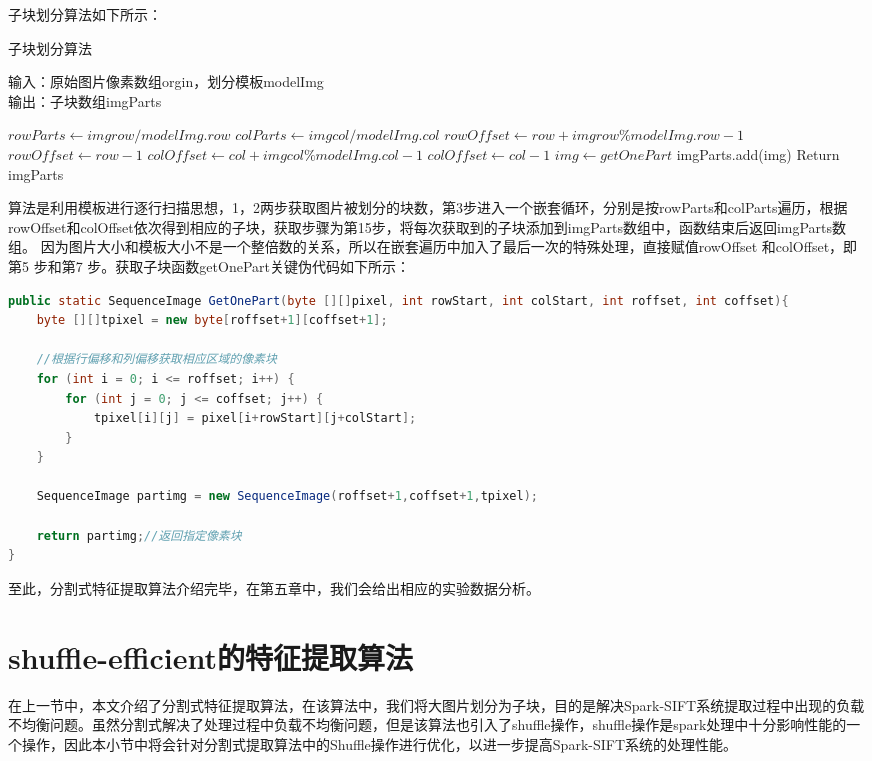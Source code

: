 子块划分算法如下所示：
\begin{algorithm}[htbp]
  \caption{子块划分算法}
  \label{algDiveModel}
  输入：原始图片像素数组orgin，划分模板modelImg\\
  输出：子块数组imgParts
  \begin{algorithmic}[1]
    \STATE $rowParts\leftarrow imgrow/modelImg.row$
    \STATE $colParts\leftarrow imgcol/modelImg.col$
        \STATE $rowOffset\leftarrow row + imgrow\%modelImg.row-1$
    \ELSE
        \STATE $rowOffset\leftarrow row - 1$
    \ENDIF
        \STATE $colOffset\leftarrow col + imgcol\%modelImg.col-1$
    \ELSE
        \STATE $colOffset\leftarrow col - 1$
    \ENDIF
    \STATE $img\leftarrow getOnePart$
    \STATE imgParts.add(img)
    \ENDFOR
    \ENDFOR
    \STATE Return imgParts
  \end{algorithmic}
\end{algorithm}

算法是利用模板进行逐行扫描思想，1，2两步获取图片被划分的块数，第3步进入一个嵌套循环，分别是按rowParts和colParts遍历，根据rowOffset和colOffset依次得到相应的子块，获取步骤为第15步，将每次获取到的子块添加到imgParts数组中，函数结束后返回imgParts数组。 因为图片大小和模板大小不是一个整倍数的关系，所以在嵌套遍历中加入了最后一次的特殊处理，直接赋值rowOffset 和colOffset，即第5 步和第7 步。获取子块函数getOnePart关键伪代码如下所示：
\begin{lstlisting}[language=Java]
public static SequenceImage GetOnePart(byte [][]pixel, int rowStart, int colStart, int roffset, int coffset){
    byte [][]tpixel = new byte[roffset+1][coffset+1];

    //根据行偏移和列偏移获取相应区域的像素块
    for (int i = 0; i <= roffset; i++) {
        for (int j = 0; j <= coffset; j++) {
            tpixel[i][j] = pixel[i+rowStart][j+colStart];
        }
    }

    SequenceImage partimg = new SequenceImage(roffset+1,coffset+1,tpixel);

    return partimg;//返回指定像素块
}
\end{lstlisting}

至此，分割式特征提取算法介绍完毕，在第五章中，我们会给出相应的实验数据分析。
\section{shuffle-efficient的特征提取算法}
在上一节中，本文介绍了分割式特征提取算法，在该算法中，我们将大图片划分为子块，目的是解决Spark-SIFT系统提取过程中出现的负载不均衡问题。虽然分割式解决了处理过程中负载不均衡问题，但是该算法也引入了shuffle操作，shuffle操作是spark处理中十分影响性能的一个操作，因此本小节中将会针对分割式提取算法中的Shuffle操作进行优化，以进一步提高Spark-SIFT系统的处理性能。
